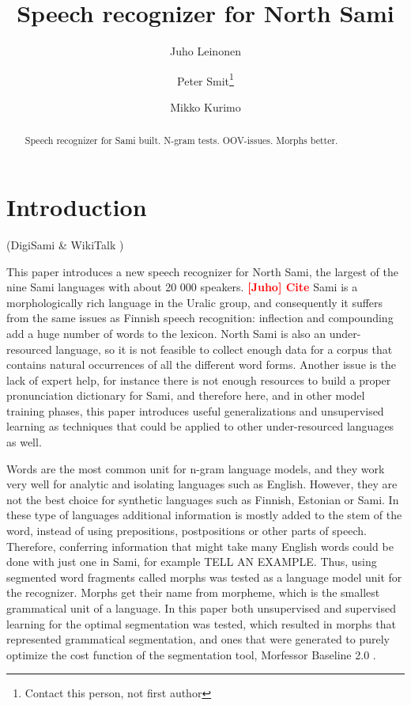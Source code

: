 \documentclass[10pt,b5paper,utf8]{article}
\newcommand{\todo}[2]{{\textcolor{red}{\bf [#1] #2 }}}
\begin{document}
\title{Speech recognizer for North Sami} \author{Juho Leinonen \and Peter Smit\footnote{Contact this person, not first author} \and Mikko Kurimo} \maketitle

\begin{abstract} Speech recognizer for Sami built. N-gram tests. OOV-issues. Morphs better. \end{abstract}

\section{Introduction}

(DigiSami \& WikiTalk \cite{wilcock2013wikitalk}\cite{jokinen2014multimodal}\cite{jokinen2014open})

This paper introduces a new speech recognizer for North Sami, the largest of the nine Sami languages with about 20 000 speakers. \todo{Juho}{Cite}  Sami is a morphologically rich language in the Uralic group, and consequently it suffers from the same issues as Finnish speech recognition: inflection and compounding add a huge number of words to the lexicon. North Sami is also an under-resourced language, so it is not feasible to collect enough data for a corpus that contains natural occurrences of all the different word forms. Another issue is the lack of expert help, for instance there is not enough resources to build a proper pronunciation dictionary for Sami, and therefore here, and in other model training phases, this paper introduces useful generalizations and unsupervised learning as techniques that could be applied to other under-resourced languages as well.

Words are the most common unit for n-gram language models, and they work very well for analytic and isolating languages such as English. However, they are not the best choice for synthetic languages such as Finnish, Estonian or Sami. In these type of languages additional information is mostly added to the stem of the word, instead of using prepositions, postpositions or other parts of speech. Therefore, conferring information that might take many English words could be done with just one in Sami, for example TELL AN EXAMPLE. Thus, using segmented word fragments called morphs was tested as a language model unit for the recognizer. Morphs get their name from morpheme, which is the smallest grammatical unit of a language. In this paper both unsupervised and supervised learning for the optimal segmentation was tested, which resulted in morphs that represented grammatical segmentation, and ones that were generated to purely optimize the cost function of the segmentation tool, Morfessor Baseline 2.0 \cite{virpioja2013morfessor}. 
\end{document}
